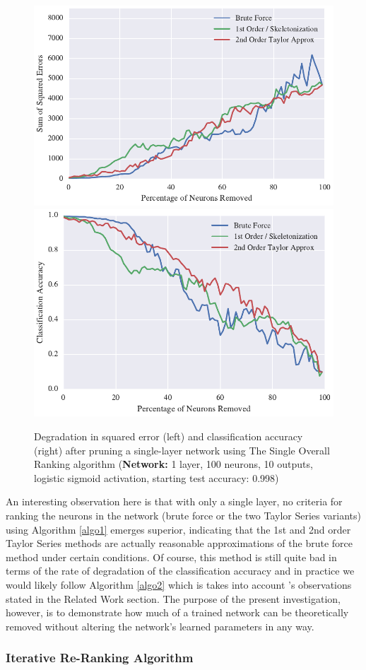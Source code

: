 \begin{figure}[!h]
\centering
\includegraphics[width=0.49\linewidth]{png/mnist-acc99-single-pass-method.pdf}
\includegraphics[width=0.49\linewidth]{png/mnist-acc99-single-pass-accuracy.pdf}
\caption{Degradation in squared error (left) and classification accuracy (right) after pruning a single-layer network using The Single Overall Ranking algorithm (\textbf{Network:} 1 layer, 100 neurons, 10 outputs, logistic sigmoid activation, starting test accuracy: 0.998)}
\label{fig:mnist-single-ranking-single-layer}
\end{figure}

An interesting observation here is that with only a single layer, no criteria for ranking the neurons in the network (brute force or the two Taylor Series variants) using Algorithm \ref{algo1} emerges superior, indicating that the 1st and 2nd order Taylor Series methods are actually reasonable approximations of the brute force method under certain conditions. Of course, this method is still quite bad in terms of the rate of degradation of the classification accuracy and in practice we would likely follow Algorithm \ref{algo2} which is takes into account \cite{mozer1989skeletonization}'s observations stated in the Related Work section. The purpose of the present investigation, however, is to demonstrate how much of a trained network can be theoretically removed without altering the network's learned parameters in any way.

\subsubsection{Iterative Re-Ranking Algorithm}

